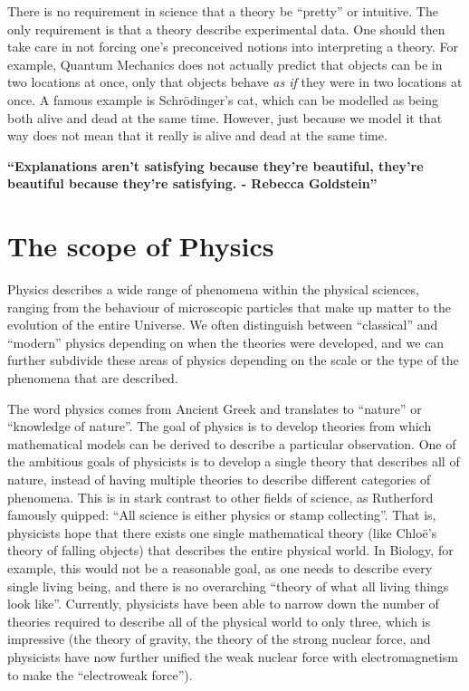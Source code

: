There is no requirement in science that a theory be ``pretty'' or intuitive. The only requirement is that a theory describe experimental data. One should then take care in not forcing one's preconceived notions into interpreting a theory. For example, Quantum Mechanics does not actually predict that objects can be in two locations at once, only that objects behave \textit{as if} they were in two locations at once. A famous example is Schr\"odinger's cat, which can be modelled as being both alive and dead at the same time. However, just because we model it that way does not mean that it really is alive and dead at the same time. 

\textbf{``Explanations aren't satisfying because they're beautiful, they're beautiful because they're satisfying. - Rebecca Goldstein''}

\section{The scope of Physics}
Physics describes a wide range of phenomena within the physical sciences, ranging from the behaviour of microscopic particles that make up matter to the evolution of the entire Universe. We often distinguish between ``classical'' and ``modern'' physics depending on when the theories were developed, and we can further subdivide these areas of physics depending on the scale or the type of the phenomena that are described.

The word physics comes from Ancient Greek and translates to ``nature'' or ``knowledge of nature''. The goal of physics is to develop theories from which mathematical models can be derived to describe a particular observation. One of the ambitious goals of physicists is to develop a single theory that describes all of nature, instead of having multiple theories to describe different categories of phenomena. This is in stark contrast to other fields of science, as Rutherford famously quipped: ``All science is either physics or stamp collecting''. That is, physicists hope that there exists one single mathematical theory (like Chlo\"e's theory of falling objects) that describes the entire physical world. In Biology, for example, this would not be a reasonable goal, as one needs to describe every single living being, and there is no overarching ``theory of what all living things look like''. Currently, physicists have been able to narrow down the number of theories required to describe all of the physical world to only three, which is impressive (the theory of gravity, the theory of the strong nuclear force, and physicists have now further unified the weak nuclear force with electromagnetism to make the ``electroweak force'').


